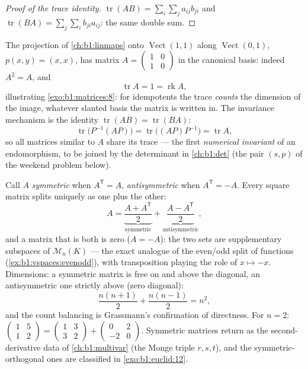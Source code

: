 \begin{proof}[Proof of the trace identity]
$\operatorname{tr}(AB) = \sum_i \sum_j a_{ij} b_{ji}$ and
$\operatorname{tr}(BA) = \sum_j \sum_i b_{ji} a_{ij}$: the same
double sum.
\end{proof}

\begin{example}
\label{ex:b1:matrices:tracework}
The projection of \cref{ch:b1:linmaps} onto
$\operatorname{Vect}(1,1)$ along $\operatorname{Vect}(0,1)$,
$p(x, y) = (x, x)$, has matrix $A = \begin{pmatrix} 1 & 0\\ 1 &
0\end{pmatrix}$ in the canonical basis: indeed $A^2 = A$, and
\[
\operatorname{tr} A = 1 = \operatorname{rk} A ,
\]
illustrating \cref{exo:b1:matrices:8}: for idempotents the trace
\emph{counts} the dimension of the image, whatever slanted basis
the matrix is written in. The invariance mechanism is the
identity $\operatorname{tr}(AB) = \operatorname{tr}(BA)$:
\[
\operatorname{tr}\bigl(P^{-1}(AP)\bigr) =
\operatorname{tr}\bigl((AP)P^{-1}\bigr) = \operatorname{tr} A ,
\]
so all matrices similar to $A$ share its trace --- the first
\emph{numerical invariant} of an endomorphism, to be joined by
the determinant in \cref{ch:b1:det} (the pair $(s, p)$ of the
weekend problem below).
\end{example}

\begin{example}
\label{ex:b1:matrices:symsplit}
Call $A$ \emph{symmetric} when $A^{\mathsf T} = A$,
\emph{antisymmetric} when $A^{\mathsf T} = -A$. Every square
matrix splits uniquely as one plus the other:
\[
A = \underbrace{\frac{A + A^{\mathsf T}}{2}}_{\text{symmetric}}
+ \underbrace{\frac{A - A^{\mathsf T}}{2}}_{\text{antisymmetric}},
\]
and a matrix that is both is zero ($A = -A$): the two sets are
supplementary subspaces of $\mathcal{M}_n(K)$ --- the exact
analogue of the even/odd split of functions
(\cref{ex:b1:vspaces:evenodd}), with transposition playing the
role of $x \mapsto -x$. Dimensions: a symmetric matrix is free
on and above the diagonal, an antisymmetric one strictly above
(zero diagonal):
\[
\frac{n(n+1)}{2} + \frac{n(n-1)}{2} = n^2 ,
\]
and the count balancing is Grassmann's confirmation of
directness. For $n = 2$: $\begin{pmatrix} 1 & 5\\ 1 &
2\end{pmatrix} = \begin{pmatrix} 1 & 3\\ 3 & 2\end{pmatrix} +
\begin{pmatrix} 0 & 2\\ -2 & 0\end{pmatrix}$. Symmetric
matrices return as the second-derivative data of
\cref{ch:b1:multivar} (the Monge triple $r, s, t$), and the
symmetric-orthogonal ones are classified in
\cref{exo:b1:euclid:12}.
\end{example}

